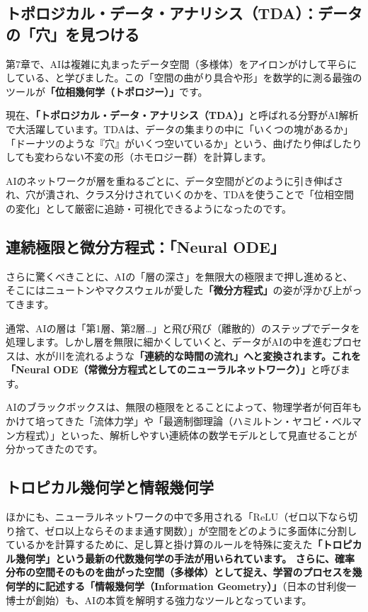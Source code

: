 \subsection{トポロジカル・データ・アナリシス（TDA）：データの「穴」を見つける}

第7章で、AIは複雑に丸まったデータ空間（多様体）をアイロンがけして平らにしている、と学びました。この「空間の曲がり具合や形」を数学的に測る最強のツールが\textbf{「位相幾何学（トポロジー）」}です。

現在、\textbf{「トポロジカル・データ・アナリシス（TDA）」}と呼ばれる分野がAI解析で大活躍しています。TDAは、データの集まりの中に「いくつの塊があるか」「ドーナツのような『穴』がいくつ空いているか」という、曲げたり伸ばしたりしても変わらない不変の形（ホモロジー群）を計算します。

AIのネットワークが層を重ねるごとに、データ空間がどのように引き伸ばされ、穴が潰され、クラス分けされていくのかを、TDAを使うことで「位相空間の変化」として厳密に追跡・可視化できるようになったのです。

\subsection{連続極限と微分方程式：「Neural ODE」}

さらに驚くべきことに、AIの「層の深さ」を無限大の極限まで押し進めると、そこにはニュートンやマクスウェルが愛した\textbf{「微分方程式」}の姿が浮かび上がってきます。

通常、AIの層は「第1層、第2層\ldots{}」と飛び飛び（離散的）のステップでデータを処理します。しかし層を無限に細かくしていくと、データがAIの中を進むプロセスは、水が川を流れるような\textbf{「連続的な時間の流れ」へと変換されます。これを「Neural ODE（常微分方程式としてのニューラルネットワーク）」}と呼びます。

AIのブラックボックスは、無限の極限をとることによって、物理学者が何百年もかけて培ってきた「流体力学」や「最適制御理論（ハミルトン・ヤコビ・ベルマン方程式）」といった、解析しやすい連続体の数学モデルとして見直せることが分かってきたのです。

\subsection{トロピカル幾何学と情報幾何学}

ほかにも、ニューラルネットワークの中で多用される「ReLU（ゼロ以下なら切り捨て、ゼロ以上ならそのまま通す関数）」が空間をどのように多面体に分割しているかを計算するために、足し算と掛け算のルールを特殊に変えた\textbf{「トロピカル幾何学」という最新の代数幾何学の手法が用いられています。 さらに、確率分布の空間そのものを曲がった空間（多様体）として捉え、学習のプロセスを幾何学的に記述する「情報幾何学（Information Geometry）」}（日本の甘利俊一博士が創始）も、AIの本質を解明する強力なツールとなっています。

